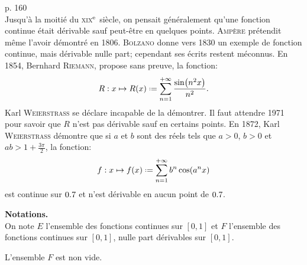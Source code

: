 
\cite{contre-exemples} p. 160 \\
Jusqu'à la moitié du \textsc{xix}$^{\mathrm{e}}$ siècle, on pensait généralement qu'une fonction continue était dérivable sauf peut-être en quelques points. \textsc{Ampère} prétendit même l'avoir démontré en 1806. \textsc{Bolzano} donne vers 1830 un exemple de fonction continue, mais dérivable nulle part; cependant ses écrits restent méconnus. En 1854, Bernhard \textsc{Riemann}, propose sans preuve, la fonction:
$$R:x \mapsto R(x) \defeq \sum_{n=1}^{+\infty} \frac{\sin(n^2 x)}{n^2}.$$
Karl \textsc{Weierstrass} se déclare incapable de la démontrer. Il faut attendre 1971 pour savoir que $R$ n'est pas dérivable sauf en certains points. En 1872, Karl \textsc{Weierstrass} démontre que si $a$ et $b$ sont des réels tels que $a > 0$, $b > 0$ et $ab > 1 + \frac{3 \pi}{2}$, la fonction:
$$f : x \mapsto f(x) \defeq \sum_{n=1}^{+\infty} b^n \cos(a^n x)$$
est continue sur $0.7$ et n'est dérivable en aucun point de $0.7$.

\textbf{Notations.}\\
On note $E$ l'ensemble des fonctions continues sur $[0, 1]$ et $F$ l'ensemble des fonctions continues sur $[0, 1]$, nulle part dérivables sur $[0, 1]$. 

\begin{theo}{}
    L'ensemble $F$ est non vide.
\end{theo}

